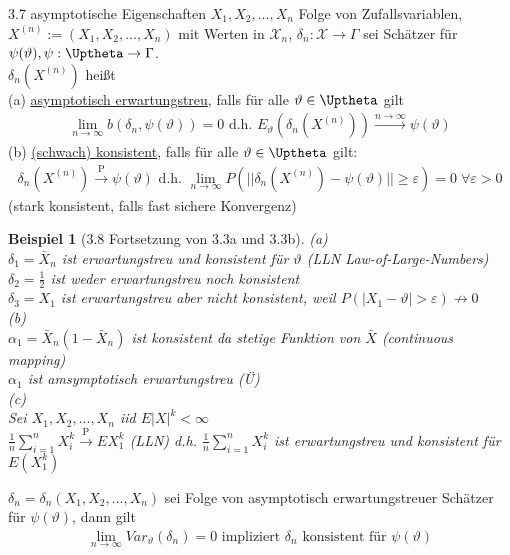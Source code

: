 \documentclass[a4paper,openany]{book}
\theoremstyle{mytheoremstyle}
\newtheorem*{bei}{Beispiel}
\theoremstyle{mytheoremstyle2}
\begin{document}
\begin{defi}{3.7 asymptotische Eigenschaften}{}
  $X_1,X_2,...,X_n $ Folge von Zufallsvariablen, $X^{(n)}:=(X_1,X_2,...,X_n)$ mit Werten in $\mathcal{X}_n$, $\delta _n:\mathcal{X}\to \Gamma $ sei Schätzer für $\psi (\vartheta ), \psi :\Uptheta\to \Gamma $. \\
  $\delta _n(X^{(n)})$ heißt \\
  (a) \underline{asymptotisch erwartungstreu}, falls für alle $\vartheta \in \Uptheta $ gilt
  \begin{align*}
    \lim _{n\to \infty }b(\delta _n,\psi (\vartheta ))=0 \text{ d.h. } E _{\vartheta }(\delta _n(X^{(n)}))\overset{n \to \infty }\longrightarrow \psi (\vartheta )
  \end{align*} 
  (b) \underline{(schwach) konsistent}, falls für alle $\vartheta \in \Uptheta$ gilt:
  \begin{align*}
    \delta _n(X^{(n)})\overset{\text{P}}\to \psi (\vartheta ) \text{ d.h. }\lim _{n\to \infty }P(||\delta _n(X^{(n)})-\psi (\vartheta )||\geq \varepsilon )=0 \; \forall \varepsilon >0
  \end{align*}
  (stark konsistent, falls fast sichere Konvergenz)
\end{defi}  
\begin{bei}[3.8 Fortsetzung von 3.3a und 3.3b]
  (a) \\
 $\delta _1=\bar{X}_n$ ist erwartungstreu und konsistent für $\vartheta $ (LLN Law-of-Large-Numbers) \\
 $\delta _2=\frac{1}{2}$ ist weder erwartungstreu noch konsistent \\
 $\delta _3=X_1$ ist erwartungstreu aber nicht konsistent, weil $P(|X_1-\vartheta |>\varepsilon)\not \to 0$\\
 (b) \\
 $\alpha _1=\bar{X}_n(1-\bar{X}_n)$ ist konsistent da stetige Funktion von $\bar{X}$ (continuous mapping) \\
 $\alpha _1$ ist amsymptotisch erwartungstreu (Ü) \\
 (c) \\
 Sei $X_1,X_2,...,X_n $ iid $E|X|^k< \infty $ \\
 $\frac{1}{n}\sum_{i=1}^{n}{X_i^k}\overset{\text{P}}\to EX_1^k$ (LLN) d.h. $\frac{1}{n}\sum_{i=1}^{n}{X_i^k}$ ist erwartungstreu und konsistent für $E(X_1^k)$ 
\end{bei}
\begin{lem}{3.9}{}
  $\delta _n=\delta _n(X_1,X_2,...,X_n)$ sei Folge von asymptotisch erwartungstreuer Schätzer für $\psi (\vartheta )$, dann gilt 
  \begin{align*}
    \lim_{n\to \infty }{Var _{\vartheta }(\delta _n)}=0 \text{ impliziert } \delta _n \text{ konsistent für }\psi (\vartheta )
  \end{align*}
\end{lem}
\end{document}
